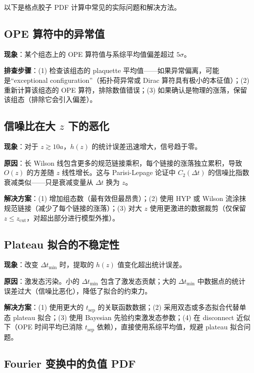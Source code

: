 \documentclass[11pt,a4paper]{ctexart}
\begin{document}
以下是格点胶子 PDF 计算中常见的实际问题和解决方法。

\subsection{OPE 算符中的异常值}

\textbf{现象}：某个组态上的 OPE 算符值与系综平均值偏差超过 $5\sigma$。

\textbf{排查步骤}：(1) 检查该组态的 plaquette 平均值——如果异常偏离，可能是``exceptional configuration''（拓扑荷异常或 Dirac 算符具有极小的本征值）；(2) 重新计算该组态的 OPE 算符，排除数值错误；(3) 如果确认是物理的涨落，保留该组态（排除它会引入偏差）。

\subsection{信噪比在大 $z$ 下的恶化}

\textbf{现象}：对于 $z \gtrsim 10a$，$h(z)$ 的统计误差迅速增大，信号趋于零。

\textbf{原因}：长 Wilson 线包含更多的规范链接乘积，每个链接的涨落独立累积，导致 $O(z)$ 的方差随 $z$ 线性增长。这与 Parisi-Lepage 论证中 $C_2(\Delta t)$ 的信噪比指数衰减类似——只是衰减变量从 $\Delta t$ 换为 $z$。

\textbf{解决方案}：(1) 增加组态数（最有效但最昂贵）；(2) 使用 HYP 或 Wilson 流涂抹规范链接（减少了每个链接的涨落）；(3) 对大 $z$ 使用更激进的数据裁剪（仅保留 $z \le z_{\text{cut}}$，对超出部分进行模型外推）。

\subsection{Plateau 拟合的不稳定性}

\textbf{现象}：改变 $\Delta t_{\text{min}}$ 时，提取的 $h(z)$ 值变化超出统计误差。

\textbf{原因}：激发态污染。小的 $\Delta t_{\text{min}}$ 包含了激发态贡献；大的 $\Delta t_{\text{min}}$ 中数据点的统计误差过大（信噪比恶化），降低了拟合的约束力。

\textbf{解决方案}：(1) 使用更大的 $t_{\text{sep}}$ 的关联函数数据；(2) 采用双态或多态拟合代替单态 plateau 拟合；(3) 使用 Bayesian 先验约束激发态参数；(4) 在 disconnect 近似下（OPE 时间平均已消除 $t_{\text{sep}}$ 依赖），直接使用系综平均值，规避 plateau 拟合问题。

\subsection{Fourier 变换中的负值 PDF}
\end{document}
